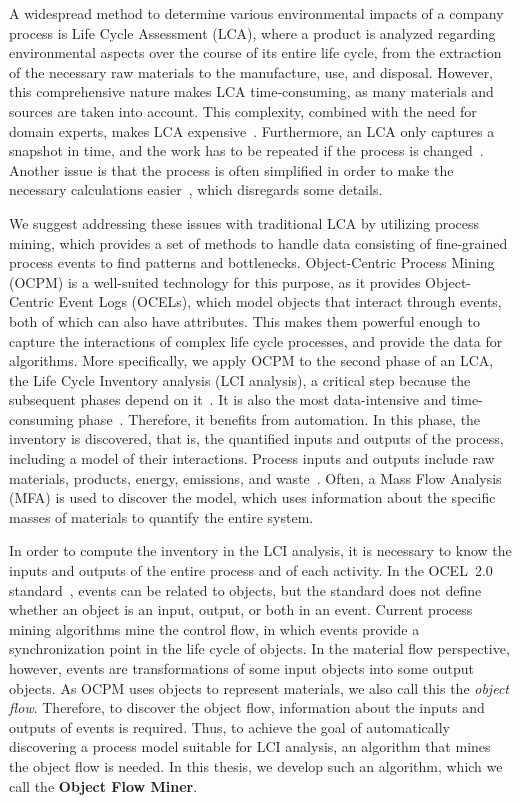 A widespread method to determine various environmental impacts of a company process is Life Cycle Assessment (LCA), where a product is analyzed regarding environmental aspects over the course of its entire life cycle, from the extraction of the necessary raw materials to the manufacture, use, and disposal.
However, this comprehensive nature makes LCA time-consuming, as many materials and sources are taken into account.
This complexity, combined with the need for domain experts, makes LCA expensive~\autocite{ortmeier2021}.
Furthermore, an LCA only captures a snapshot in time, and the work has to be repeated if the process is changed~\autocite{schneider2023}.
Another issue is that the process is often simplified in order to make the necessary calculations easier~\autocite{grahl}, which disregards some details.



We suggest addressing these issues with traditional LCA by utilizing process mining, which provides a set of methods to handle data consisting of fine-grained process events to find patterns and bottlenecks.
Object-Centric Process Mining (OCPM) is a well-suited technology for this purpose, as it provides Object-Centric Event Logs (OCELs), which model objects that interact through events, both of which can also have attributes.
This makes them powerful enough to capture the interactions of complex life cycle processes, and provide the data for algorithms.
More specifically, we apply OCPM to the second phase of an LCA, the Life Cycle Inventory analysis (LCI analysis), a critical step because the subsequent phases depend on it~\autocite{ansah2021}.
It is also the most data-intensive and time-consuming phase~\autocite{kock2023}.
Therefore, it benefits from automation.
In this phase, the inventory is discovered, that is, the quantified inputs and outputs of the process, including a model of their interactions.
Process inputs and outputs include raw materials, products, energy, emissions, and waste~\autocite{kock2023}.
Often, a Mass Flow Analysis (MFA) is used to discover the model, which uses information about the specific masses of materials to quantify the entire system.



In order to compute the inventory in the LCI analysis, it is necessary to know the inputs and outputs of the entire process and of each activity.
In the OCEL~2.0 standard~\autocite{ocel20}, events can be related to objects, but the standard does not define whether an object is an input, output, or both in an event.
Current process mining algorithms mine the control flow, in which events provide a synchronization point in the life cycle of objects.
In the material flow perspective, however, events are transformations of some input objects into some output objects.
As OCPM uses objects to represent materials, we also call this the \emph{object flow}.
Therefore, to discover the object flow, information about the inputs and outputs of events is required.
Thus, to achieve the goal of automatically discovering a process model suitable for LCI analysis, an algorithm that mines the object flow is needed.
In this thesis, we develop such an algorithm, which we call the \textbf{Object Flow Miner}.



